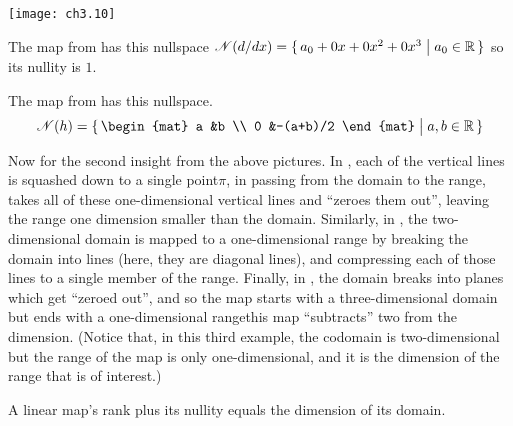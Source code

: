 \begin{center}
  \texttt{[image: ch3.10]}
\end{center}

\begin{example}
The map from  has this nullspace
\( \mathscr{N}(d/dx)=\mbox{$\{\,a_0+0x+0x^2+0x^3\bigm| a_0\in\mathbb{R}\,\}$} \)
so its nullity is $1$.
\end{example}

\begin{example}
The map from 
has this nullspace.
\begin{equation*}
   \nullspace{h}=\set{\begin{mat}
                         a  &b          \\
                         0  &-(a+b)/2
                      \end{mat}\suchthat a,b\in\Re}
\end{equation*}
\end{example}

Now for the second insight from the above pictures.
In , each of the vertical lines is squashed down 
to a single point\Dash $\pi$, in passing from the domain to the range,
takes all of these one-dimensional vertical lines and ``zeroes them out'', 
leaving the range one dimension smaller than the domain.
Similarly, in , the
two-dimensional domain is mapped to a one-dimensional range by breaking 
the domain into lines (here, they are diagonal lines), 
and compressing each of those lines to a single member of the range.
Finally, in ,
the domain breaks into planes which get
``zeroed out'', and so the map starts with a three-dimensional domain
but ends with a
one-dimensional range\Dash this map ``subtracts'' two from the dimension. 
(Notice that, in this third example, the codomain is
two-dimensional but the range of the map is only one-dimensional, and it is
the dimension of the range that is of interest.)

\begin{theorem}
\label{th:RankPlusNullEqDim}
A linear map's rank plus its nullity equals the dimension of its domain.
\end{theorem}

